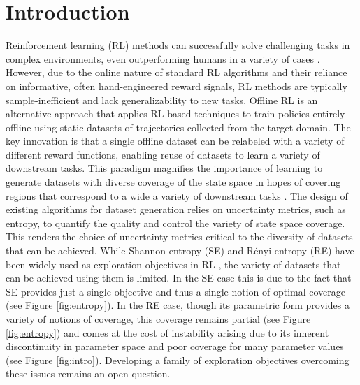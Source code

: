 \section{Introduction}

Reinforcement learning (RL) methods can successfully solve challenging tasks in complex environments, even outperforming humans in a variety of cases \citep{mnih2015human, silver2018general}. However, due to the online nature of standard RL algorithms and their reliance on informative, often hand-engineered reward signals, RL methods are typically sample-inefficient and lack generalizability to new tasks. Offline RL \citep{levine2020offline, prudencio2023survey} is an alternative approach that applies RL-based techniques to train policies entirely offline using static datasets of trajectories collected from the target domain. The key innovation is that a single offline dataset can be relabeled with a variety of different reward functions, enabling reuse of datasets to learn a variety of downstream tasks. This paradigm magnifies the importance of learning to generate datasets with diverse coverage of the state space in hopes of covering regions that correspond to a wide a variety of downstream tasks \cite{yarats2022don}. The design of existing algorithms for dataset generation \citep{pathak2017curiosity, eysenbach2018diversity, lee2019efficient, burda2019exploration, liu2021behavior, yarats2021reinforcement} relies on uncertainty metrics, such as entropy, to quantify the quality and control the variety of state space coverage. This renders the choice of uncertainty metrics critical to the diversity of datasets that can be achieved. While Shannon entropy (SE) and R\'{e}nyi entropy (RE) have been widely used as exploration objectives in RL \cite{hazan2019provably, liu2021behavior, yarats2021reinforcement, zhang2021exploration, yuan2022renyi}, the variety of datasets that can be achieved using them is limited. In the SE case this is due to the fact that SE provides just a single objective and thus a single notion of optimal coverage (see Figure \ref{fig:entropy}). In the RE case, though its parametric form provides a variety of notions of coverage, this coverage remains partial (see Figure \ref{fig:entropy}) and comes at the cost of instability arising due to its inherent discontinuity in parameter space \citep{suresh2024robotic} and poor coverage for many parameter values (see Figure \ref{fig:intro}). Developing a family of exploration objectives overcoming these issues remains an open question.


